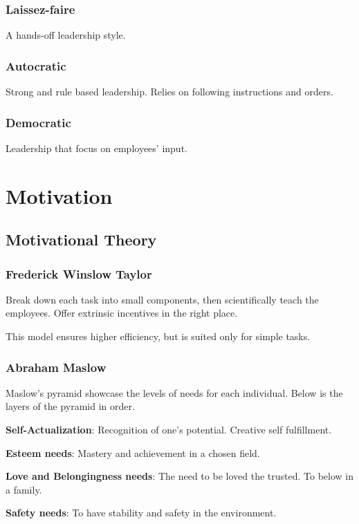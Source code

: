 \documentclass{standalone}
\begin{document}
\subsubsection{Laissez-faire}
A hands-off leadership style.

\subsubsection{Autocratic}
Strong and rule based leadership.
Relies on following instructions and orders.

\subsubsection{Democratic}
Leadership that focus on employees' input.

\section{Motivation}

\subsection{Motivational Theory}

\subsubsection{Frederick Winslow Taylor}
Break down each task into small components, then scientifically teach the employees.
Offer extrinsic incentives in the right place.

This model ensures higher efficiency, but is suited only for simple tasks.

\subsubsection{Abraham Maslow}
Maslow's pyramid showcase the levels of needs for each individual.
Below is the layers of the pyramid in order.

\textbf{Self-Actualization}: Recognition of one's potential.
Creative self fulfillment.

\textbf{Esteem needs}: Mastery and achievement in a chosen field.

\textbf{Love and Belongingness needs}: The need to be loved the trusted. 
To below in a family.

\textbf{Safety needs}: To have stability and safety in the environment.
\end{document}
